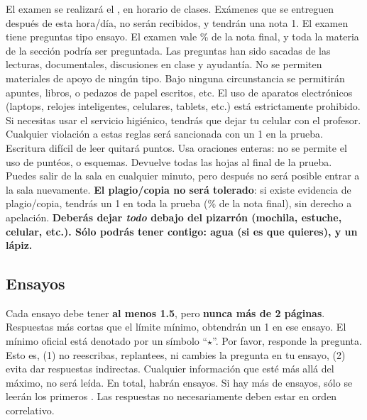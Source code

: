 \documentclass{article}
\begin{document}
El examen se realizar\'a el \underline{{\unskip}}, en horario de clases. Ex\'amenes que se entreguen despu\'es de esta hora/d\'ia, no ser\'an recibidos, y tendr\'an una nota 1. El examen tiene {\unskip} preguntas tipo ensayo. El examen vale {\unskip}\% de la nota final, y toda la materia de la secci\'on podr\'ia ser preguntada. Las preguntas han sido sacadas de las lecturas, documentales, discusiones en clase y ayudant\'ia. No se permiten materiales de apoyo de ning\'un tipo. Bajo ninguna circunstancia se permitir\'an apuntes, libros, o pedazos de papel escritos, etc. El uso de aparatos electr\'onicos (laptops, relojes inteligentes, celulares, tablets, etc.) est\'a estrictamente prohibido. Si necesitas usar el servicio higi\'enico, tendr\'as que dejar tu celular con el profesor. Cualquier violaci\'on a estas reglas ser\'a sancionada con un 1 en la prueba.  Escritura dif\'icil de leer quitar\'a puntos. Usa oraciones enteras: no se permite el uso de punt\'eos, o esquemas. Devuelve todas las hojas al final de la prueba. Puedes salir de la sala en cualquier minuto, pero despu\'es no ser\'a posible entrar a la sala nuevamente. {\bf El plagio/copia no ser\'a tolerado}: si existe evidencia de plagio/copia, tendr\'as un 1 en toda la prueba ({\unskip}\% de la nota final), sin derecho a apelaci\'on. {\bf Deber\'as dejar \emph{todo} debajo del pizarr\'on (mochila, estuche, celular, etc.). S\'olo podr\'as tener contigo: agua (si es que quieres), y un l\'apiz.}


 

\subsection*{Ensayos}

Cada ensayo debe tener {\bf al menos 1.5}, pero {\bf nunca m\'as de 2 p\'aginas}. Respuestas m\'as cortas que el l\'imite m\'inimo, obtendr\'an un 1 en ese ensayo. El m\'inimo oficial est\'a denotado por un s\'imbolo ``$\star$''. Por favor, responde la pregunta. Esto es, (1) no reescribas, replantees, ni cambies la pregunta en tu ensayo, (2) evita dar respuestas indirectas. Cualquier informaci\'on que est\'e m\'as all\'a del m\'aximo, no ser\'a le\'ida. En total, habr\'an {\unskip} ensayos. Si hay m\'as de {\unskip} ensayos, s\'olo se leer\'an los primeros {\unskip}. Las respuestas no necesariamente deben estar en orden correlativo.
\end{document}
